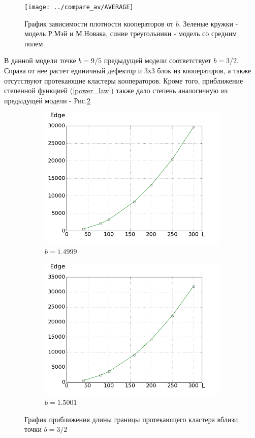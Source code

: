 \documentclass[a4paper]{article}
\begin{document}
	\begin{figure}[H]
			\centering
			\texttt{[image: ../compare\_av/AVERAGE]}
			\caption{График зависимости плотности кооператоров от $b$. Зеленые кружки - модель Р.Мэй и М.Новака, синие треугольники - модель со средним полем}
			\label{average}
	\end{figure}
	
	\par В данной модели точке $b=9/5$ предыдущей модели соответствует $b=3/2$. Справа от нее растет единичный дефектор и 3х3 блок из кооператоров, а также отсутствуют протекающие кластеры кооператоров. Кроме того, приближение степенной функцией (\ref{power_law}) также дало степень аналогичную из предыдущей модели - Рис.\ref{new_edge} 
	
	\begin{figure}
		\begin{subfigure}{.6\textwidth}
			\includegraphics[width=.8\linewidth]{new_edge_left.png}
			\caption{$b=1.4999$}
		\end{subfigure}
		\begin{subfigure}{.6\textwidth}
			\includegraphics[width=.8\linewidth]{new_edge_right.png}
			\caption{$b=1.5001$}
		\end{subfigure}
		\caption{График приближения длины границы протекающего кластера вблизи точки $b=3/2$}
		\label{new_edge}
	\end{figure}
	
\end{document}
